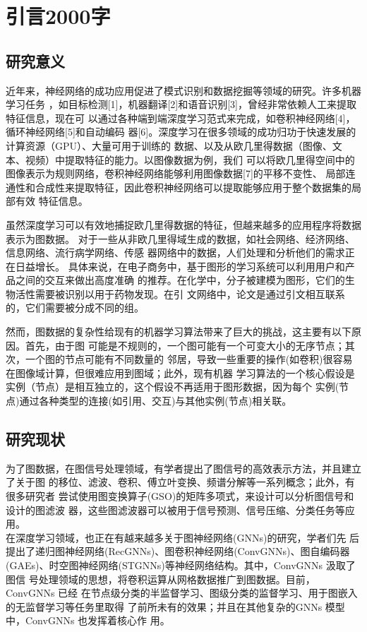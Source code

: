 \cleardoublepage

\section{引言2000字}

\subsection{研究意义}
近年来，神经网络的成功应用促进了模式识别和数据挖掘等领域的研究。许多机器学习任务
，如目标检测[1]，机器翻译[2]和语音识别[3]，曾经非常依赖人工来提取特征信息，现在可
以通过各种端到端深度学习范式来完成，如卷积神经网络[4]，循环神经网络[5]和自动编码
器[6]。深度学习在很多领域的成功归功于快速发展的计算资源（GPU）、大量可用于训练的
数据、以及从欧几里得数据（图像、文本、视频）中提取特征的能力。以图像数据为例，我们
可以将欧几里得空间中的图像表示为规则网络，卷积神经网络能够利用图像数据[7]的平移不变性、
局部连通性和合成性来提取特征，因此卷积神经网络可以提取能够应用于整个数据集的局部有效
特征信息。

虽然深度学习可以有效地捕捉欧几里得数据的特征，但越来越多的应用程序将数据表示为图数据。
对于一些从非欧几里得域生成的数据，如社会网络、经济网络、信息网络、流行病学网络、传感
器网络中的数据，人们处理和分析他们的需求正在日益增长。
具体来说，在电子商务中，基于图形的学习系统可以利用用户和产品之间的交互来做出高度准确
的推荐。在化学中，分子被建模为图形，它们的生物活性需要被识别以用于药物发现。在引
文网络中，论文是通过引文相互联系的，它们需要被分成不同的组。

然而，图数据的复杂性给现有的机器学习算法带来了巨大的挑战，这主要有以下原因。首先，由于图
可能是不规则的，一个图可能有一个可变大小的无序节点；其次，一个图的节点可能有不同数量的
邻居，导致一些重要的操作(如卷积)很容易在图像域计算，但很难应用到图域；此外，现有机器
学习算法的一个核心假设是实例（节点）是相互独立的，这个假设不再适用于图形数据，因为每个
实例(节点)通过各种类型的连接(如引用、交互)与其他实例(节点)相关联。

\subsection{研究现状}
为了图数据，在图信号处理领域，有学者提出了图信号的高效表示方法，并且建立了关于图
的移位、滤波、卷积、傅立叶变换、频谱分解等一系列概念；此外，有很多研究者
尝试使用图变换算子(GSO)的矩阵多项式，来设计可以分析图信号和设计的图滤波
器，这些图滤波器可以被用于信号预测、信号压缩、分类任务等应用。
\\
在深度学习领域，也正在有越来越多关于图神经网络(GNNs)的研究，学者们先
后提出了递归图神经网络(RecGNNs)、图卷积神经网络(ConvGNNs)、图自编码器
(GAEs)、时空图神经网络(STGNNs)等神经网络结构。其中，ConvGNNs 汲取了图信
号处理领域的思想，将卷积运算从网格数据推广到图数据。目前，ConvGNNs 已经
在节点级分类的半监督学习、图级分类的监督学习、用于图嵌入的无监督学习等任务里取得
了前所未有的效果；并且在其他复杂的GNNs 模型中，ConvGNNs 也发挥着核心作
用。
